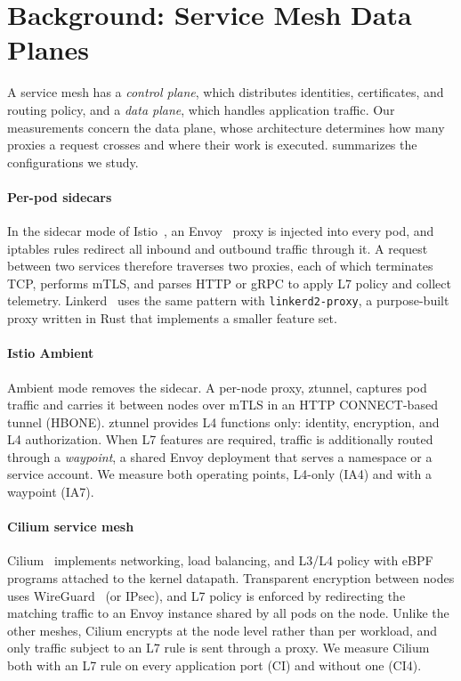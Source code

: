 \section{Background: Service Mesh Data Planes}
\label{sec:background}

A service mesh has a \emph{control plane}, which distributes identities,
certificates, and routing policy, and a \emph{data plane}, which handles
application traffic. Our measurements concern the data plane, whose
architecture determines how many proxies a request crosses and where their work
is executed.  summarizes the configurations we study.

\paragraph{Per-pod sidecars}
In the sidecar mode of Istio~\cite{istio}, an Envoy~\cite{envoy} proxy is injected into every pod, and
iptables rules redirect all inbound and outbound traffic through it. A request
between two services therefore traverses two proxies, each of which terminates
TCP, performs mTLS, and parses HTTP or gRPC to apply L7 policy and collect
telemetry. Linkerd~\cite{linkerd} uses the same pattern with \texttt{linkerd2-proxy}, a
purpose-built proxy written in Rust that implements a smaller feature set.

\paragraph{Istio Ambient}
Ambient mode removes the sidecar. A per-node proxy, ztunnel, captures pod
traffic and carries it between nodes over mTLS in an HTTP CONNECT-based tunnel
(HBONE). ztunnel provides L4 functions only: identity, encryption, and L4
authorization. When L7 features are required, traffic is additionally routed
through a \emph{waypoint}, a shared Envoy deployment that serves a namespace or
a service account. We measure both operating points, L4-only (IA4) and with a
waypoint (IA7).

\paragraph{Cilium service mesh}
Cilium~\cite{cilium} implements networking, load balancing, and L3/L4 policy with eBPF
programs attached to the kernel datapath. Transparent encryption between nodes
uses WireGuard~\cite{donenfeld2017wireguard} (or IPsec), and L7 policy is enforced by redirecting the matching
traffic to an Envoy instance shared by all pods on the node. Unlike the other
meshes, Cilium encrypts at the node level rather than per workload, and only
traffic subject to an L7 rule is sent through a proxy. We measure Cilium both with an L7
rule on every application port (CI) and without one (CI4).

